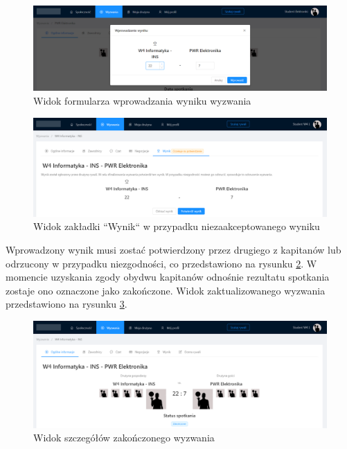 \begin{figure}[H]
\centering
\includegraphics[width=\linewidth]{065-dzialanie/rys/ss-match-6.PNG}
\caption{Widok formularza wprowadzania wyniku wyzwania}
\label{fig:ss--match-6}
\end{figure}

\begin{figure}[H]
\centering
\includegraphics[width=\linewidth]{065-dzialanie/rys/ss-match-8.PNG}
\caption{Widok zakładki ``Wynik`` w przypadku niezaakceptowanego wyniku}
\label{fig:ss--match-8}
\end{figure}

Wprowadzony wynik musi zostać potwierdzony przez drugiego z kapitanów lub odrzucony w przypadku niezgodności, co przedstawiono na rysunku \ref{fig:ss--match-8}. W momencie uzyskania zgody obydwu kapitanów odnośnie rezultatu spotkania zostaje ono oznaczone jako zakończone. Widok zaktualizowanego wyzwania przedstawiono na rysunku \ref{fig:ss--match-9}.

\begin{figure}[H]
\centering
\includegraphics[width=\linewidth]{065-dzialanie/rys/ss-match-9.PNG}
\caption{Widok szczegółów zakończonego wyzwania}
\label{fig:ss--match-9}
\end{figure}

